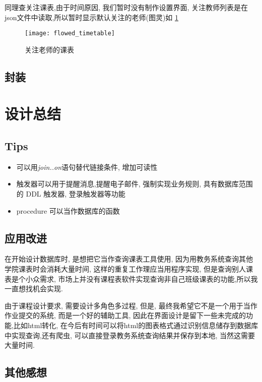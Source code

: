 \documentclass{myreport}
\begin{document}
    同理查关注课表,由于时间原因,
    我们暂时没有制作设置界面, 关注教师列表是在json文件中读取,所以暂时显示默认关注的老师(图灵)如
    \cref{fig:flowed_timetable}
    \begin{figure}[H]
      \centering
      \texttt{[image: flowed\_timetable]}
      \caption{关注老师的课表}
      \label{fig:flowed_timetable}
    \end{figure}

  \subsection{封装}







\section{设计总结}
  \subsection{Tips}
    \begin{itemize}
      \item 可以用\emph{join..on}语句替代链接条件, 增加可读性
      \item 触发器可以用于提醒消息,提醒电子邮件,
        强制实现业务规则,
        具有数据库范围的 DDL 触发器,
        登录触发器等功能
      \item procedure 可以当作数据库的函数
    \end{itemize}
  \subsection{应用改进}
    在开始设计数据库时, 是想把它当作查询课表工具使用,
    因为用教务系统查询其他学院课表时会消耗大量时间,
    这样的重复工作理应当用程序实现,
    但是查询别人课表是个小众需求, 市场上并没有课程表软件实现查询非自己班级课表的功能,所以我一直想找机会实现.

    由于课程设计要求, 需要设计多角色多过程,
    但是, 最终我希望它不是一个用于当作作业提交的系统,
    而是一个好的辅助工具, 因此在界面设计是留下一些未完成的功能,比如html转化, 在今后有时间可以将html的图表格式通过识别信息储存到数据库中实现查询,还有爬虫, 可以直接登录教务系统查询结果并保存到本地, 当然这需要大量时间.
  \subsection{其他感想}
\end{document}
